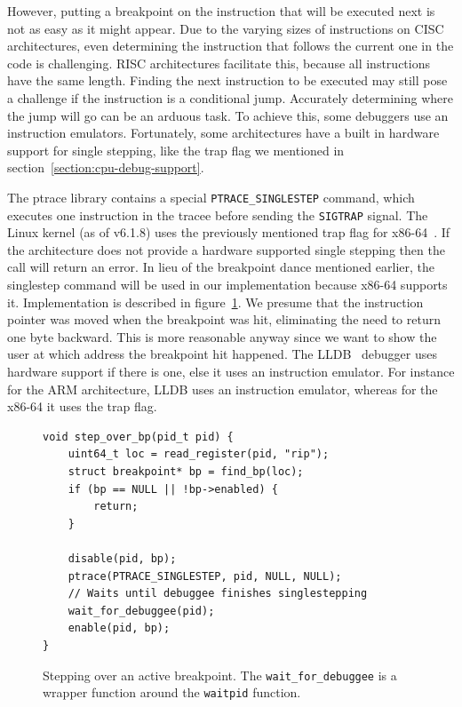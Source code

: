 However, putting a breakpoint on the instruction that will be executed next is
not as easy as it might appear. Due to the varying sizes of instructions on
CISC architectures, even determining the instruction that follows the current
one in the code is challenging. RISC architectures facilitate this, because all
instructions have the same length. Finding the next instruction to be executed
may still pose a challenge if the instruction is a conditional jump. Accurately
determining where the jump will go can be an arduous task. To achieve this,
some debuggers use an instruction emulators. Fortunately, some architectures
have a built in hardware support for single stepping, like the trap flag we
mentioned in section~\ref{section:cpu-debug-support}.

The ptrace library contains a special \texttt{PTRACE\_SINGLESTEP} command,
which executes one instruction in the tracee before sending the
\texttt{SIGTRAP} signal. The Linux kernel (as of v6.1.8) uses the previously
mentioned trap flag for x86-64~\cite{linuxkernel-trapflag}. If the architecture
does not provide a hardware supported single stepping then the call will return
an error. In lieu of the breakpoint dance mentioned earlier, the singlestep
command will be used in our implementation because x86-64 supports it.
Implementation is described in figure~\ref{fig:singlestep}. We presume that the
instruction pointer was moved when the breakpoint was hit, eliminating the need
to return one byte backward. This is more reasonable anyway since we want to
show the user at which address the breakpoint hit happened. The
LLDB~\cite{lldb} debugger uses hardware support if there is one, else it uses
an instruction emulator. For instance for the ARM architecture, LLDB uses an
instruction emulator, whereas for the x86-64 it uses the trap flag.

\begin{figure}
    \begin{verbatim}
void step_over_bp(pid_t pid) {
    uint64_t loc = read_register(pid, "rip");
    struct breakpoint* bp = find_bp(loc);
    if (bp == NULL || !bp->enabled) {
        return;
    }

    disable(pid, bp);
    ptrace(PTRACE_SINGLESTEP, pid, NULL, NULL);
    // Waits until debuggee finishes singlestepping
    wait_for_debuggee(pid);
    enable(pid, bp);
}
    \end{verbatim}
    \caption{Stepping over an active breakpoint. The \texttt{wait\_for\_debuggee}
    is a wrapper function around the \texttt{waitpid} function.}
    \label{fig:singlestep}
\end{figure}

